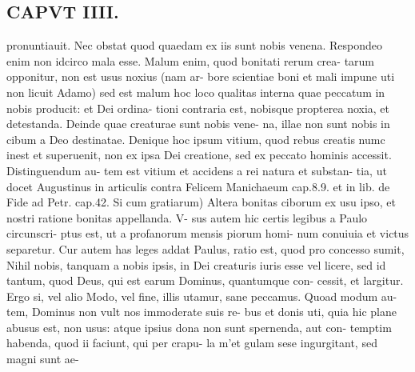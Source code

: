 \documentclass{article}
\begin{document}
\begin{pages}
\section*{CAPVT  IIII. }
\marginpar{[ p.1. ]}pronuntiauit. Nec obstat quod quaedam ex iis sunt nobis venena. Respondeo enim non idcirco mala esse. Malum enim, quod bonitati rerum crea- tarum opponitur, non est usus noxius (nam ar- bore scientiae boni et mali impune uti non licuit Adamo) sed est malum hoc loco qualitas interna quae peccatum in nobis producit: et Dei ordina- tioni contraria est, nobisque propterea noxia, et detestanda. Deinde quae creaturae sunt nobis vene- na, illae non sunt nobis in cibum a Deo destinatae. Denique hoc ipsum vitium, quod rebus creatis numc inest et superuenit, non ex ipsa Dei creatione, sed ex peccato hominis accessit. Distinguendum au- tem est vitium et accidens a rei natura et substan- tia, ut docet Augustinus in articulis contra Felicem Manichaeum cap.8.9. et in lib. de Fide ad Petr. cap.42. Si cum gratiarum) Altera bonitas ciborum ex usu ipso, et nostri ratione bonitas appellanda. V- sus autem hic certis legibus a Paulo circunscri- ptus est, ut a profanorum mensis piorum homi- num conuiuia et victus separetur. Cur autem has leges addat Paulus, ratio est, quod pro concesso sumit, Nihil nobis, tanquam a nobis ipsis, in Dei creaturis iuris esse vel licere, sed id tantum, quod Deus, qui est earum Dominus, quantumque con- cessit, et largitur. Ergo si, vel alio Modo, vel fine, illis utamur, sane peccamus. Quoad modum au- tem, Dominus non vult nos immoderate suis re- bus et donis uti, quia hic plane abusus est, non usus: atque ipsius dona non sunt spernenda, aut con- temptim habenda, quod ii faciunt, qui per crapu- la m'et gulam sese ingurgitant, sed magni sunt ae- 

\end{pages}
\end{document}
